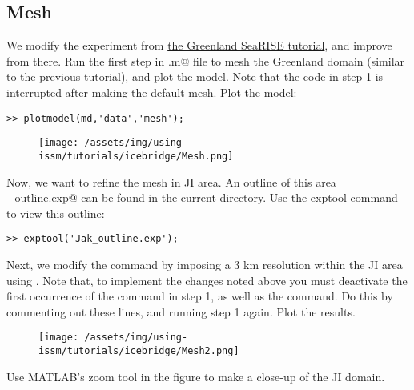 \subsection{Mesh} %
We modify the experiment from \href{../greenland}{the Greenland SeaRISE tutorial}, and improve from there. Run the first step in \verb@runme.m@ file to mesh the Greenland domain (similar to the previous tutorial), and plot the model. Note that the code in step 1 is interrupted after making the default mesh. Plot the model:
\begin{verbatim}>> plotmodel(md,'data','mesh');\end{verbatim}
\begin{figure}[H]
	\begin{center}
		\texttt{[image: /assets/img/using-issm/tutorials/icebridge/Mesh.png]}
	\end{center}
\end{figure}
Now, we want to refine the mesh in JI area. An outline of this area \verb@Jak_outline.exp@ can be found in the current directory. Use the exptool command to view this outline:
\begin{verbatim}>> exptool('Jak_outline.exp');\end{verbatim}

Next, we modify the \verb@bamg@ command by imposing a 3 km resolution within the JI area using \verb@hmaxVertices@. Note that, to implement the changes noted above you must deactivate the first occurrence of the \verb@bamg@ command in step 1, as well as the \verb@return@ command. Do this by commenting out these lines, and running step 1 again. Plot the results.
\begin{figure}[H]
	\begin{center}
		\texttt{[image: /assets/img/using-issm/tutorials/icebridge/Mesh2.png]}
	\end{center}
\end{figure}
Use MATLAB's zoom tool in the figure to make a close-up of the JI domain.
